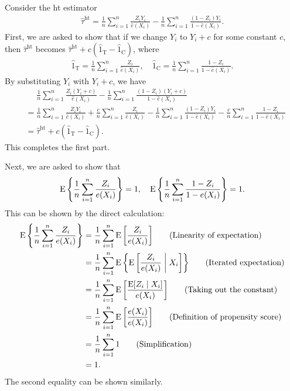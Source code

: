 \documentclass[10pt]{article}
\begin{document}
Consider the \gls{ht} estimator
\begin{align*}
  \hat{\tau}^{\text{ht}}
  = \frac{1}{n} \sum_{i=1}^n \frac{Z_i Y_i}{\hat{e}(X_i)} 
  - \frac{1}{n} \sum_{i=1}^n \frac{(1 - Z_i) Y_i}{1 - \hat{e}(X_i)}.
\end{align*}
First, we are asked to show that
if we change $Y_i$ to $Y_i + c$ for some constant $c$,
then $\hat{\tau}^{\text{ht}}$ 
becomes $\hat{\tau}^{\text{ht}} + c(\hat{1}_{\text{T}} - \hat{1}_{\text{C}})$,
where
\begin{align*}
  \hat{1}_{\text{T}} = \frac{1}{n} \sum_{i=1}^n \frac{Z_i}{\hat{e}(X_i)}, \quad
  \hat{1}_{\text{C}} = \frac{1}{n} \sum_{i=1}^n \frac{1 - Z_i}{1 - \hat{e}(X_i)}.
\end{align*}
By substituting $Y_i$ with $Y_i + c$, we have
\begin{align*}
  &\mathrel{\phantom{=}} \frac{1}{n} \sum_{i=1}^n \frac{Z_i (Y_i + c)}{\hat{e}(X_i)} 
    - \frac{1}{n} \sum_{i=1}^n \frac{(1 - Z_i) (Y_i + c)}{1 - \hat{e}(X_i)} \\
  &= \frac{1}{n} \sum_{i=1}^n \frac{Z_i Y_i}{\hat{e}(X_i)} 
    + \frac{c}{n} \sum_{i=1}^n \frac{Z_i}{\hat{e}(X_i)}
    - \frac{1}{n} \sum_{i=1}^n \frac{(1 - Z_i) Y_i}{1 - \hat{e}(X_i)}
    - \frac{c}{n} \sum_{i=1}^n \frac{1 - Z_i}{1 - \hat{e}(X_i)} \\
  &= \hat{\tau}^{\text{ht}} + c(\hat{1}_{\text{T}} - \hat{1}_{\text{C}}).
\end{align*}
This completes the first part.

Next, we are asked to show that
\begin{align*}
  \operatorname{E}{\left\lbrace \frac{1}{n} \sum_{i=1}^n \frac{Z_i}{e(X_i)} \right\rbrace} = 1, \quad 
  \operatorname{E}{\left\lbrace \frac{1}{n} \sum_{i=1}^n \frac{1 - Z_i}{1 - e(X_i)} \right\rbrace} = 1.
\end{align*}
This can be shown by the direct calculation:
\begin{align*}
  \operatorname{E}{\left\lbrace \frac{1}{n} \sum_{i=1}^n \frac{Z_i}{e(X_i)} \right\rbrace}
  &= \frac{1}{n} \sum_{i=1}^n \operatorname{E}{\left[ \frac{Z_i}{e(X_i)} \right]} \tag{Linearity of expectation} \\
  &= \frac{1}{n} \sum_{i=1}^n \operatorname{E}{\left\lbrace \operatorname{E}{\left[ \frac{Z_i}{e(X_i)} \;\middle|\; X_i \right]} \right\rbrace} \tag{Iterated expectation} \\
  &= \frac{1}{n} \sum_{i=1}^n \operatorname{E}{\left[ \frac{\operatorname{E}[Z_i \mid X_i]}{e(X_i)} \right]} \tag{Taking out the constant} \\
  &= \frac{1}{n} \sum_{i=1}^n \operatorname{E}{\left[ \frac{e(X_i)}{e(X_i)} \right]} \tag{Definition of propensity score} \\
  &= \frac{1}{n} \sum_{i=1}^n 1 \tag{Simplification} \\
  &= 1.
\end{align*}
The second equality can be shown similarly.
\end{document}
